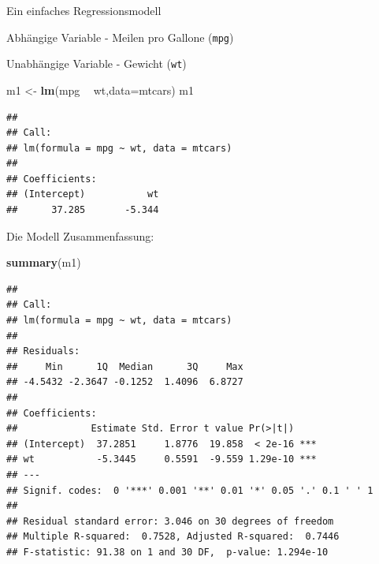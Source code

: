 \documentclass[ignorenonframetext,]{beamer}
\newenvironment{Shaded}{\begin{snugshade}}{\end{snugshade}}
\newcommand{\DataTypeTok}[1]{\textcolor[rgb]{0.13,0.29,0.53}{#1}}
\newcommand{\KeywordTok}[1]{\textcolor[rgb]{0.13,0.29,0.53}{\textbf{#1}}}
\newcommand{\NormalTok}[1]{#1}
\newcommand{\OperatorTok}[1]{\textcolor[rgb]{0.81,0.36,0.00}{\textbf{#1}}}
\newcommand{\StringTok}[1]{\textcolor[rgb]{0.31,0.60,0.02}{#1}}
\begin{document}
\begin{frame}[fragile]{Ein einfaches Regressionsmodell}
\protect\hypertarget{ein-einfaches-regressionsmodell}{}

\begin{block}{Abhängige Variable - Meilen pro Gallone (\texttt{mpg})}

\end{block}

\begin{block}{Unabhängige Variable - Gewicht (\texttt{wt})}

\begin{Shaded}
\begin{Highlighting}[]
\NormalTok{m1 <-}\StringTok{ }\KeywordTok{lm}\NormalTok{(mpg }\OperatorTok{~}\StringTok{ }\NormalTok{wt,}\DataTypeTok{data=}\NormalTok{mtcars)}
\NormalTok{m1}
\end{Highlighting}
\end{Shaded}

\begin{verbatim}
## 
## Call:
## lm(formula = mpg ~ wt, data = mtcars)
## 
## Coefficients:
## (Intercept)           wt  
##      37.285       -5.344
\end{verbatim}

\end{block}

\end{frame}

\begin{frame}[fragile]{Die Modell Zusammenfassung:}
\protect\hypertarget{die-modell-zusammenfassung}{}

\begin{Shaded}
\begin{Highlighting}[]
\KeywordTok{summary}\NormalTok{(m1) }
\end{Highlighting}
\end{Shaded}

\begin{verbatim}
## 
## Call:
## lm(formula = mpg ~ wt, data = mtcars)
## 
## Residuals:
##     Min      1Q  Median      3Q     Max 
## -4.5432 -2.3647 -0.1252  1.4096  6.8727 
## 
## Coefficients:
##             Estimate Std. Error t value Pr(>|t|)    
## (Intercept)  37.2851     1.8776  19.858  < 2e-16 ***
## wt           -5.3445     0.5591  -9.559 1.29e-10 ***
## ---
## Signif. codes:  0 '***' 0.001 '**' 0.01 '*' 0.05 '.' 0.1 ' ' 1
## 
## Residual standard error: 3.046 on 30 degrees of freedom
## Multiple R-squared:  0.7528, Adjusted R-squared:  0.7446 
## F-statistic: 91.38 on 1 and 30 DF,  p-value: 1.294e-10
\end{verbatim}

\end{frame}
\end{document}
